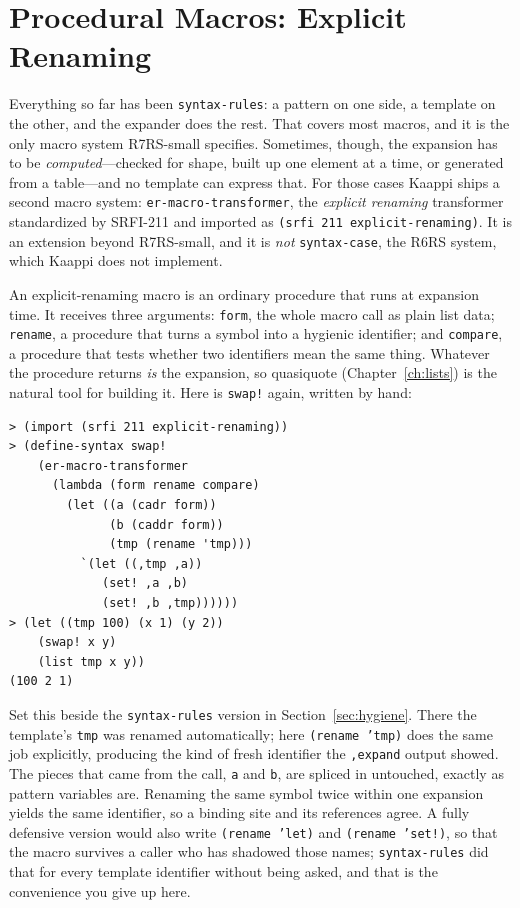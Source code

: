 \section{Procedural Macros: Explicit Renaming}
\label{sec:er-macros}

Everything so far has been \texttt{syntax-rules}: a pattern on one side, a template on the other, and the expander does the rest. That covers most macros, and it is the only macro system R7RS-small specifies. Sometimes, though, the expansion has to be \emph{computed}---checked for shape, built up one element at a time, or generated from a table---and no template can express that. For those cases Kaappi ships a second macro system: \texttt{er-macro-transformer}, the \emph{explicit renaming} transformer standardized by SRFI-211 and imported as \texttt{(srfi 211 explicit-renaming)}. It is an extension beyond R7RS-small, and it is \emph{not} \texttt{syntax-case}, the R6RS system, which Kaappi does not implement.

An explicit-renaming macro is an ordinary procedure that runs at expansion time. It receives three arguments: \texttt{form}, the whole macro call as plain list data; \texttt{rename}, a procedure that turns a symbol into a hygienic identifier; and \texttt{compare}, a procedure that tests whether two identifiers mean the same thing. Whatever the procedure returns \emph{is} the expansion, so quasiquote (Chapter~\ref{ch:lists}) is the natural tool for building it. Here is \texttt{swap!} again, written by hand:

\begin{lstlisting}[style=repl]
> (import (srfi 211 explicit-renaming))
> (define-syntax swap!
    (er-macro-transformer
      (lambda (form rename compare)
        (let ((a (cadr form))
              (b (caddr form))
              (tmp (rename 'tmp)))
          `(let ((,tmp ,a))
             (set! ,a ,b)
             (set! ,b ,tmp))))))
> (let ((tmp 100) (x 1) (y 2))
    (swap! x y)
    (list tmp x y))
(100 2 1)
\end{lstlisting}

Set this beside the \texttt{syntax-rules} version in Section~\ref{sec:hygiene}. There the template's \texttt{tmp} was renamed automatically; here \texttt{(rename 'tmp)} does the same job explicitly, producing the kind of fresh identifier the \texttt{,expand} output showed. The pieces that came from the call, \texttt{a} and \texttt{b}, are spliced in untouched, exactly as pattern variables are. Renaming the same symbol twice within one expansion yields the same identifier, so a binding site and its references agree. A fully defensive version would also write \texttt{(rename 'let)} and \texttt{(rename 'set!)}, so that the macro survives a caller who has shadowed those names; \texttt{syntax-rules} did that for every template identifier without being asked, and that is the convenience you give up here.

